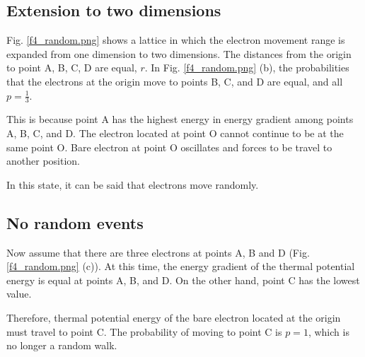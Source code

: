 \documentclass[reprint,amsmath,amssymb,aps,]{revtex4-1}
\numberwithin{equation}{section}%
\begin{document}
\subsection{
    \label{Extension to two dimensions}Extension to two dimensions}

    Fig. \ref{f4_random.png} shows a lattice in which the electron movement range is expanded from one dimension to two dimensions. The distances from the origin to point A, B, C, D are equal, $r$. In Fig. \ref{f4_random.png} (b), the probabilities that the electrons at the origin move to points B, C, and D are equal, and all $ p = \frac{1}{3} $.

    This is because point A has the highest energy in energy gradient among points A, B, C, and D. The electron located at point O cannot continue to be at the same point O. Bare electron at point O oscillates and forces to be travel to another position.

    In this state, it can be said that electrons move randomly.



\subsection{
    \label{sec:No random events}No random events}

    Now assume that there are three electrons at points A, B and D (Fig. \ref{f4_random.png} (c)). At this time, the energy gradient of the thermal potential energy is equal at points A, B, and D. On the other hand, point C has the lowest value.

    Therefore, thermal potential energy of the bare electron  located at the origin must travel to point C. The probability of moving to point C is $p = 1$, which is no longer a random walk.
    
\end{document}
